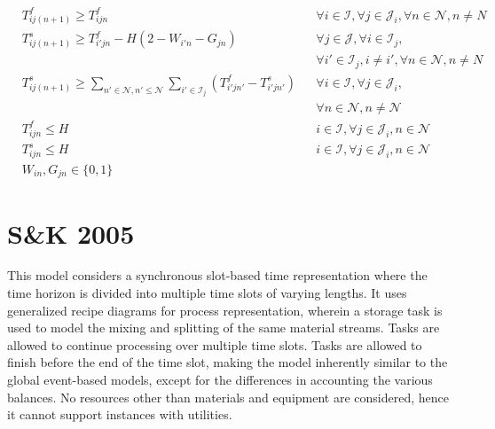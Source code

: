 \begin{align}
		     & T_{ij(n+1)}^f \ge T_{ijn}^f && \forall i \in \mathcal{I}, \forall j \in \mathcal{J}_i, \forall n \in \mathcal{N}, n \ne N \\
		     & T_{ij(n+1)}^s \ge T_{i'jn}^f - H (2 - W_{i'n} - G_{jn}) && \forall j \in \mathcal{J}, \forall i \in \mathcal{I}_j, \\
		     & &&\forall i' \in \mathcal{I}_j, i \ne i', \forall n \in \mathcal{N}, n \ne N \nonumber \\
		     & T_{ij(n+1)}^s \ge \sum_{n' \in \mathcal{N}, n' \le \mathcal{N}} \sum_{i' \in \mathcal{I}_j} (T_{i'jn'}^f - T_{i'jn'}^s) &&\forall i \in \mathcal{I}, \forall j \in \mathcal{J}_i, \\ 
		     & &&\forall n \in \mathcal{N}, n \ne \mathcal{N} \nonumber \\
		     & T_{ijn}^f \le H && i \in \mathcal{I}, \forall j \in \mathcal{J}_i, n \in \mathcal{N} \\
		     & T_{ijn}^s \le H &&  i \in \mathcal{I}, \forall j \in \mathcal{J}_i, n \in \mathcal{N} \\
		     &W_{in}, G_{jn} \in \{0,1\}
\end{align}

\section{S\&K 2005}
This model \citep{Karimi} considers a synchronous slot-based time representation where the time horizon is divided into multiple time slots of varying lengths. It uses generalized recipe diagrams for process representation, wherein a storage task is used to model the mixing and splitting of the same material streams. Tasks are allowed to continue processing over multiple time slots. Tasks are allowed to finish before the end of the time slot, making the model inherently similar to the global event-based models, except for the differences in accounting the various balances. No resources other than materials and equipment are considered, hence it cannot support instances with utilities.

